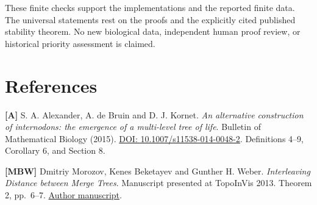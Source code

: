 \documentclass[
  11pt,
  letterpaper,
]{article}
\begin{document}
These finite checks support the implementations and the reported finite
data. The universal statements rest on the proofs and the explicitly
cited published stability theorem. No new biological data, independent
human proof review, or historical priority assessment is claimed.

\section{References}\label{references}

\textbf{{[}A{]}} S. A. Alexander, A. de Bruin and D. J. Kornet. \emph{An
alternative construction of internodons: the emergence of a multi-level
tree of life}. Bulletin of Mathematical Biology (2015).
\href{https://doi.org/10.1007/s11538-014-0048-2}{DOI:
10.1007/s11538-014-0048-2}. Definitions 4--9, Corollary 6, and Section
8.

\textbf{{[}MBW{]}} Dmitriy Morozov, Kenes Beketayev and Gunther H.
Weber. \emph{Interleaving Distance between Merge Trees}. Manuscript
presented at TopoInVis 2013. Theorem 2, pp.~6--7.
\href{https://www.mrzv.org/publications/interleaving-distance-merge-trees/manuscript/}{Author
manuscript}.
\end{document}
